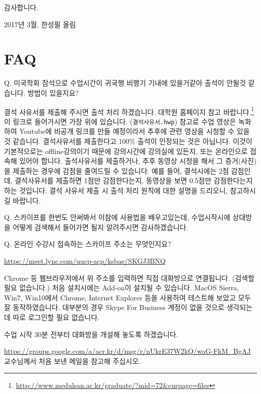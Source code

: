 \documentclass[12pt,]{krantz}
\renewenvironment{quote}{\begin{VF}}{\end{VF}}
\renewcommand{\href}[2]{#2\footnote{\url{#1}}}
\theoremstyle{definition}
\theoremstyle{definition}
\theoremstyle{remark}
\begin{document}
감사합니다.

2017년 3월, 한성필 올림

\section*{FAQ}\label{faq}


\begin{quote}
Q. 미국학회 참석으로 수업시간이 귀국행 비행기 기내에 있을거같아 출석이
안될것 같습니다. 방법이 있을지요?
\end{quote}

결석 사유서를 제출해 주시면 출석 처리 하겠습니다.
\href{http://www.medulsan.ac.kr/graduate/?mid=72\&curpage=files}{대학원
홈페이지 참고 바랍니다.} 이 링크로 들어가시면 가장 위에 있습니다.
(\texttt{결석사유서.hwp}) 참고로 수업 영상은 녹화하여 Youtube에 비공개
링크를 만들 예정이라서 추후에 관련 영상을 시청할 수 있을 것 같습니다.
결석사유서를 제출한다고 100\% 출석이 인정되는 것은 아닙니다. 이것이
기본적으로는 offline강의이기 때문에 강의시간에 강의실에 있든지, 또는
온라인으로 접속해 있어야 합니다. 출석사유서를 제출하거나, 추후 동영상
시청을 해서 그 증거(사진)을 제출하는 경우에 감점을 줄여드릴 수 있습니다.
예를 들어, 결석시에는 2점 감점인데, 결석사유서를 제출하면 1점만
감점한다는지, 동영상을 보면 0.5점만 감점한다는지 하는 것입니다. 결석
사유서 제출 시 출석 처리 원칙에 대한 설명을 드리오니, 참고하시길
바랍니다.

\begin{quote}
Q. 스카이프를 한번도 안써봐서 이참에 사용법을 배우고있는데, 수업시작시에
상대방을 어떻게 검색해서 들어가면 될지 알려주시면 감사하겠습니다.
\end{quote}

\begin{quote}
Q. 온라인 수강시 접속하는 스카이프 주소는 무엇인지요?
\end{quote}

\url{https://meet.lync.com/uucp-acp/ksbae/SKGJ3BNQ}

Chrome 등 웹브라우저에서 위 주소를 입력하면 직접 대화방으로 연결됩니다.
(검색할 필요 없습니다.) 처음 설치시에는 Add-on이 설치될 수 있습니다.
MacOS Sierra, Win7, Win10에서 Chrome, Internet Explorer 등을 사용하여
테스트해 보았고 모두 잘 동작하였습니다. 대부분의 경우 Skype For Business
계정이 없을 것으로 생각되는데 따로 로그인할 필요 없습니다.

수업 시작 30분 전부터 대화방을 개설해 놓도록 하겠습니다.

\url{https://groups.google.com/a/acr.kr/d/msg/r/nUkrE37W2kQ/waG-FkM_BgAJ}
교수님께서 처음 보낸 메일을 참고해 주십시오.
\end{document}
